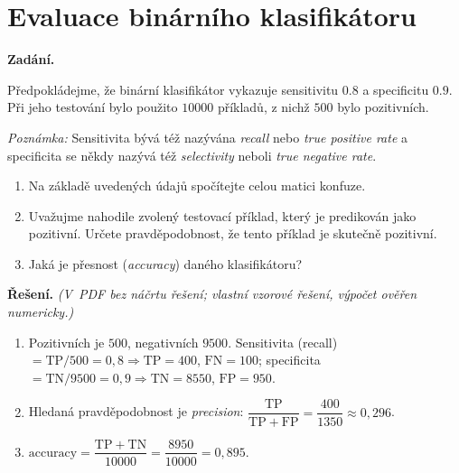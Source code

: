 \section{Evaluace binárního klasifikátoru}

\noindent\textbf{Zadání.}\par
Předpokládejme, že binární klasifikátor vykazuje sensitivitu $0.8$ a specificitu $0.9$.
Při jeho testování bylo použito $10000$ příkladů, z nichž $500$ bylo pozitivních.

\medskip
\noindent\textit{Poznámka:} Sensitivita bývá též nazývána \emph{recall} nebo \emph{true positive rate}
a specificita se někdy nazývá též \emph{selectivity} neboli \emph{true negative rate}.

\begin{enumerate}
  \item Na základě uvedených údajů spočítejte celou matici konfuze.
  \item Uvažujme nahodile zvolený testovací příklad, který je predikován jako pozitivní.
    Určete pravděpodobnost, že tento příklad je skutečně pozitivní.
  \item Jaká je přesnost (\emph{accuracy}) daného klasifikátoru?
\end{enumerate}

\medskip
\noindent\textbf{Řešení.} \textit{(V~PDF bez náčrtu řešení; vlastní vzorové řešení, výpočet ověřen numericky.)}\par
\begin{enumerate}[nosep]
  \item Pozitivních je $500$, negativních $9500$. Sensitivita (recall) $=\mathrm{TP}/500=0{,}8\Rightarrow \mathrm{TP}=400$, $\mathrm{FN}=100$; specificita $=\mathrm{TN}/9500=0{,}9\Rightarrow \mathrm{TN}=8550$, $\mathrm{FP}=950$.
  \item Hledaná pravděpodobnost je \emph{precision}: $\dfrac{\mathrm{TP}}{\mathrm{TP}+\mathrm{FP}}=\dfrac{400}{1350}\approx 0{,}296$.
  \item $\mathrm{accuracy}=\dfrac{\mathrm{TP}+\mathrm{TN}}{10000}=\dfrac{8950}{10000}=0{,}895$.
\end{enumerate}
